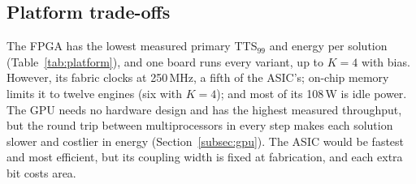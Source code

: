 \subsection{Platform trade-offs}\label{subsec:tradeoffs}
The FPGA has the lowest measured primary TTS$_{99}$ and energy per solution (Table~\ref{tab:platform}), and one board runs every variant, up to $K=4$ with bias. However, its fabric clocks at 250\,MHz, a fifth of the ASIC's; on-chip memory limits it to twelve engines (six with $K=4$); and most of its 108\,W is idle power. The GPU needs no hardware design and has the highest measured throughput, but the round trip between multiprocessors in every step makes each solution slower and costlier in energy (Section~\ref{subsec:gpu}). The ASIC would be fastest and most efficient, but its coupling width is fixed at fabrication, and each extra bit costs area.

